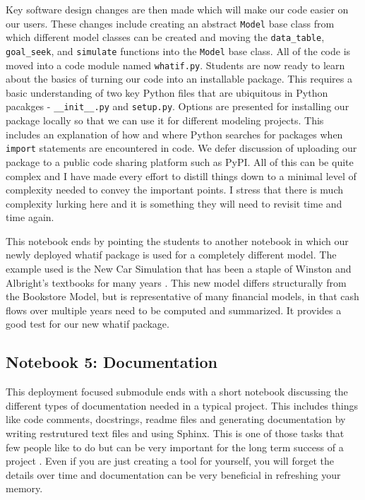 \documentclass[ited,blindrev]{informs3}              %
\newcommand{\code}[1]{\texttt{#1}}
\begin{document}
Key software design changes are then made which will make our code easier on our users. These changes include creating an abstract \code{Model} base class from which different model classes can be created and moving the \code{data\_table}, \code{goal\_seek}, and \code{simulate} functions into the \code{Model} base class. All of the code is moved into a code module named \code{whatif.py}. Students are now ready to learn about the basics of turning our code into an installable package. This requires a basic understanding of two key Python files that are ubiquitous in Python pacakges - \code{\_\_init\_\_.py} and \code{setup.py}. Options are presented for installing our package locally so that we can use it for different modeling projects. This includes an explanation of how and where Python searches for packages when \code{import} statements are encountered in code. We defer discussion of uploading our package to a public code sharing platform such as PyPI. All of this can be quite complex and I have made every effort to distill things down to a minimal level of complexity needed to convey the important points. I stress that there is much complexity lurking here and it is something they will need to revisit time and time again.

This notebook ends by pointing the students to another notebook in which our newly deployed whatif package is used for a completely different model. The example used is the New Car Simulation that has been a staple of Winston and Albright's textbooks for many years \cite{bibid}. This new model differs structurally from the Bookstore Model, but is representative of many financial models, in that cash flows over multiple years need to be computed and summarized. It provides a good test for our new whatif package. 

\subsection{Notebook 5: Documentation}

This deployment focused submodule ends with a short notebook discussing the different types of documentation needed in a typical project. This includes things like code comments, docstrings, readme files and generating documentation by writing restrutured text files and using Sphinx. This is one of those tasks that few people like to do but can be very important for the long term success of a project \cite{bibid}. Even if you are just creating a tool for yourself, you will forget the details over time and documentation can be very beneficial in refreshing your memory. 
\end{document}
